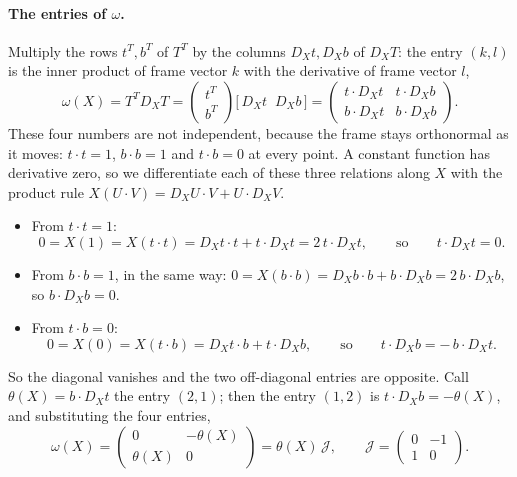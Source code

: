 \paragraph{The entries of $\omega$.} Multiply the rows $t^T, b^T$ of $T^T$ by the columns $D_X t, D_X b$ of $D_X T$: the entry $(k, l)$ is the inner product of frame vector $k$ with the derivative of frame vector $l$,
\begin{equation*}
\omega(X) = T^T D_X T = \begin{pmatrix} t^T \\ b^T \end{pmatrix} \big[\, D_X t \;\; D_X b \,\big] = \begin{pmatrix} t \cdot D_X t & t \cdot D_X b \\ b \cdot D_X t & b \cdot D_X b \end{pmatrix}.
\end{equation*}
These four numbers are not independent, because the frame stays orthonormal as it moves: $t\cdot t = 1$, $b\cdot b = 1$ and $t\cdot b = 0$ at every point. A constant function has derivative zero, so we differentiate each of these three relations along $X$ with the product rule $X(U\cdot V) = D_X U\cdot V + U\cdot D_X V$.
\begin{itemize}
\item From $t\cdot t = 1$:
\begin{equation*}
0 = X(1) = X(t\cdot t) = D_X t\cdot t + t\cdot D_X t = 2\, t\cdot D_X t, \qquad\text{so}\qquad t\cdot D_X t = 0 .
\end{equation*}
\item From $b\cdot b = 1$, in the same way: $0 = X(b\cdot b) = D_X b\cdot b + b\cdot D_X b = 2\, b\cdot D_X b$, so $b\cdot D_X b = 0$.
\item From $t\cdot b = 0$:
\begin{equation*}
0 = X(0) = X(t\cdot b) = D_X t\cdot b + t\cdot D_X b, \qquad\text{so}\qquad t\cdot D_X b = -\, b\cdot D_X t .
\end{equation*}
\end{itemize}
So the diagonal vanishes and the two off-diagonal entries are opposite. Call $\theta(X) = b \cdot D_X t$ the entry $(2, 1)$; then the entry $(1, 2)$ is $t\cdot D_X b = -\theta(X)$, and substituting the four entries,
\begin{equation*}
\omega(X) = \begin{pmatrix} 0 & -\theta(X) \\ \theta(X) & 0 \end{pmatrix} = \theta(X)\, \mathcal J, \qquad \mathcal J = \begin{pmatrix} 0 & -1 \\ 1 & 0 \end{pmatrix} .
\end{equation*}
